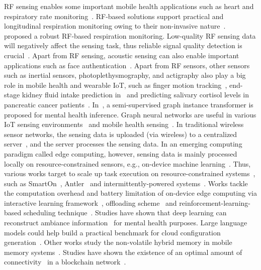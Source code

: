 RF sensing enables some important mobile health applications such as heart and respiratory rate monitoring~\cite{zongxing2022uwb,zongxing2022measure}. 
RF-based solutions support practical and longitudinal respiration monitoring owing to their non-invasive nature~\cite{zongxing2023rf,zongxing2021uwb}.
~\cite{zongxing2024rfq} proposed a robust RF-based respiration monitoring.
Low-quality RF sensing data will negatively affect the sensing task, thus reliable signal quality detection is crucial~\cite{zongxing2021quality}.
Apart from RF sensing, acoustic sensing can also enable important applications such as face authentication~\cite{zongxing2019face,zongxing2022face}.
Apart from RF sensors, other sensors such as inertial sensors, photoplethysmography, and actigraphy also play a big role in mobile health and wearable IoT, 
such as finger motion tracking~\cite{yilin2021}, end-stage kidney fluid intake prediction in~\cite{guimin2022health} and predicting salivary cortisol levels in pancreatic cancer patients~\cite{guimin2021pancreatic}.
In~\cite{guimin2021health}, a semi-supervised graph instance transformer is proposed for mental health inference.
Graph neural networks are useful in various IoT sensing environments~\cite{guimin2023survey} and mobile health sensing~\cite{guimin_thesis}.
In traditional wireless sensor networks, the sensing data is uploaded (via wireless) to a centralized server~\cite{gupta2020,yubo2023blockchain}, and the server processes the sensing data.
In an emerging computing paradigm called edge computing, however, sensing data is mainly processed locally on resource-constrained sensors, 
e.g., on-device machine learning~\cite{yubo2020ondevice,yubo2022demo,yubo2019ondevice}.
Thus, various works target to scale up task execution on resource-constrained systems~\cite{yubo_thesis}, such as 
SmartOn~\cite{yubo2021smarton}, Antler~\cite{yubo2023efficient} and intermittently-powered systems~\cite{yubo2023audio,yubo2023intermittent}.
Works tackle the computation overhead and battery limitation of on-device edge computing via 
interactive learning framework~\cite{zhou2022}, offloading scheme~\cite{zhou2023offloading} and reinforcement-learning-based scheduling technique~\cite{zhou2023}.
Studies have shown that deep learning can reconstruct ambiance information~\cite{wenwan} for mental health purposes.
Large language models could help build a practical benchmark for cloud configuration generation~\cite{yuning2023cloud}.
Other works study the non-volatile hybrid memory in mobile memory systems~\cite{feiwen2021,feiwen2021fpga,feiwen2022}.
Studies have shown the existence of an optimal amount of connectivity~\cite{yifan2023} in a blockchain network~\cite{yifan2023topiary}.

